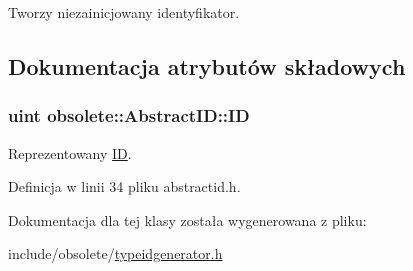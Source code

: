 Tworzy niezainicjowany identyfikator. 



\subsection{Dokumentacja atrybutów składowych}
\hypertarget{classobsolete_1_1AbstractID_a5f67fa1c7d96085f0ef41193b60b570c}{
\subsubsection[{ID}]{\setlength{\rightskip}{0pt plus 5cm}uint {\bf obsolete::AbstractID::ID}}}
\label{classobsolete_1_1AbstractID_a5f67fa1c7d96085f0ef41193b60b570c}


Reprezentowany \hyperlink{classobsolete_1_1ID}{ID}. 



Definicja w linii 34 pliku abstractid.h.



Dokumentacja dla tej klasy została wygenerowana z pliku:\begin{DoxyCompactItemize}
\item 
include/obsolete/\hyperlink{typeidgenerator_8h}{typeidgenerator.h}\end{DoxyCompactItemize}
